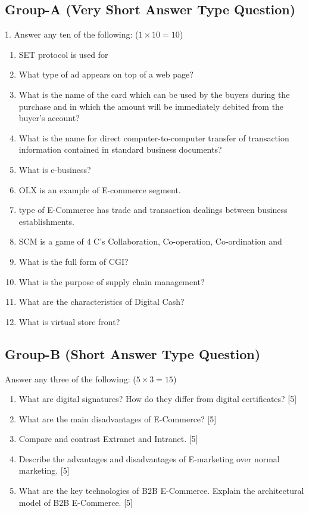 \subsection*{Group-A (Very Short Answer Type Question)}
1. Answer any ten of the following: ($1 \times 10 = 10$)
\begin{enumerate}
    \item[(I)] SET protocol is used for \underline{\hspace{2cm}}
    \item[(II)] What type of ad appears on top of a web page?
    \item[(III)] What is the name of the card which can be used by the buyers during the purchase and in which the amount will be immediately debited from the buyer's account?
    \item[(IV)] What is the name for direct computer-to-computer transfer of transaction information contained in standard business documents?
    \item[(V)] What is e-business?
    \item[(VI)] OLX is an example of \underline{\hspace{2cm}} E-commerce segment.
    \item[(VII)] \underline{\hspace{2cm}} type of E-Commerce has trade and transaction dealings between business establishments.
    \item[(VIII)] SCM is a game of 4 C's Collaboration, Co-operation, Co-ordination and \underline{\hspace{2cm}}
    \item[(IX)] What is the full form of CGI?
    \item[(X)] What is the purpose of supply chain management?
    \item[(XI)] What are the characteristics of Digital Cash?
    \item[(XII)] What is virtual store front?
\end{enumerate}

\subsection*{Group-B (Short Answer Type Question)}
Answer any three of the following: ($5 \times 3 = 15$)
\begin{enumerate}
    \item[2.] What are digital signatures? How do they differ from digital certificates? [5]
    \item[3.] What are the main disadvantages of E-Commerce? [5]
    \item[4.] Compare and contrast Extranet and Intranet. [5]
    \item[5.] Describe the advantages and disadvantages of E-marketing over normal marketing. [5]
    \item[6.] What are the key technologies of B2B E-Commerce. Explain the architectural model of B2B E-Commerce. [5]
\end{enumerate}

